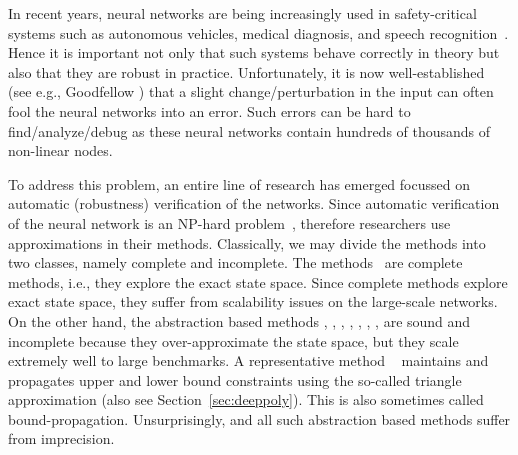 









In recent years, neural networks are being increasingly used in safety-critical systems such as autonomous vehicles, medical diagnosis, and speech recognition~\cite{bojarski2016end,amato2013artificial,hinton2012deep}. Hence it is important not only that such systems behave correctly in theory but also that they are robust in practice. Unfortunately, it is now well-established (see e.g., Goodfellow \cite{goodfellow2014explaining}) that a slight change/perturbation in the input can often fool the neural networks into an error. Such errors can be hard to find/analyze/debug as these neural networks contain hundreds of thousands of non-linear nodes.

To address this problem, an entire line of research has emerged focussed on automatic (robustness) verification of the networks. Since automatic verification of the neural network is an NP-hard problem~\cite{?}, therefore researchers use approximations in their methods. Classically, we may divide the methods into two classes, namely complete and incomplete. The methods~\cite{lomuscio2017approach,fischetti2018deep,dutta2018output,cheng2017maximum,katz2017reluplex,katz2019marabou,ehlers2017formal,huang2017safety,wang2021beta,xu2020fast,zhang2022general} are complete methods, i.e., they explore the exact state space. Since complete methods explore exact state space, they suffer from scalability issues on the large-scale networks. On the other hand, the abstraction based methods \cite{dvijotham2018dual}, \cite{gehr2018ai2}, \cite{singh2018fast},  \cite{singh2018boosting}, \cite{weng2018towards}, \cite{wong2018provable}, \cite{zhang2018efficient}, \cite{zhang2018efficient} are sound and incomplete because they over-approximate the state space, but they scale extremely well to large benchmarks. A representative method \deeppoly{}~\cite{singh2019abstract} maintains and propagates upper and lower bound constraints using the so-called triangle approximation (also see Section~\ref{sec:deeppoly}). This is also sometimes called bound-propagation. %
Unsurprisingly, \deeppoly{} and all such abstraction based methods suffer from imprecision.

